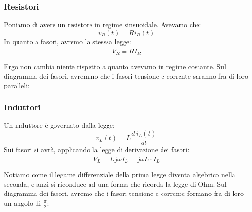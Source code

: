 \documentclass[a4paper,11pt]{article}
\begin{document}
\subsubsection{Resistori}
Poniamo di avere un resistore in regime sinsuoidale.
Avevamo che:
$$
v_R(t) = R i_R(t)
$$
In quanto a fasori, avremo la stesssa legge:
$$
\dot{V}_R = R \dot{I}_R
$$

Ergo non cambia niente rispetto a quanto avevamo in regime costante.
Sul diagramma dei fasori, avremmo che i fasori tensione e corrente saranno fra di loro paralleli:
\begin{center}
\end{center}

\subsubsection{Induttori}
Un induttore è governato dalla legge:
$$
v_L(t) = L \frac{d \, i_L(t)}{dt}
$$
Sui fasori si avrà, applicando la legge di derivazione dei fasori:
$$
\dot{V}_L = L j \omega \dot{I}_L = j \omega L \cdot \dot{I}_L
$$

Notiamo come il legame differenziale della prima legge diventa algebrico nella seconda, e anzi si riconduce ad una forma che ricorda la legge di Ohm.
Sul diagramma dei fasori, avremo che i fasori tensione e corrente formano fra di loro un angolo di $\frac{\pi}{2}$:
\begin{center}
\end{center}
\end{document}
